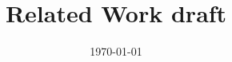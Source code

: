 %
%
%
%
%

\documentclass[11pt]{article}
\usepackage[T1]{fontenc}
\usepackage[utf8]{inputenc}
\usepackage[margin=1in]{geometry}
\usepackage{amsmath}

\title{Related Work draft}
\author{}
\date{\today}


\maketitle


\section{Related Work}
\label{sec:related}

